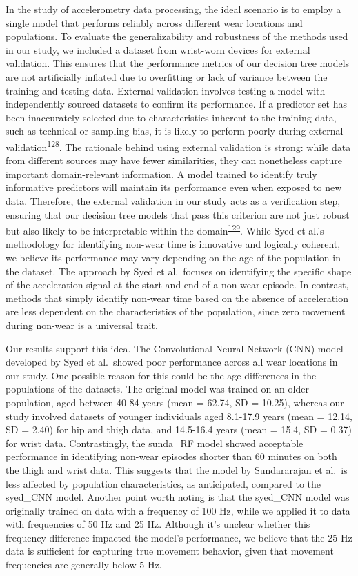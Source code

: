 \documentclass[
  9pt,
]{scrbook}
\begin{document}
In the study of accelerometry data processing, the ideal scenario is to
employ a single model that performs reliably across different wear
locations and populations. To evaluate the generalizability and
robustness of the methods used in our study, we included a dataset from
wrist-worn devices for external validation. This ensures that the
performance metrics of our decision tree models are not artificially
inflated due to overfitting or lack of variance between the training and
testing data. External validation involves testing a model with
independently sourced datasets to confirm its performance. If a
predictor set has been inaccurately selected due to characteristics
inherent to the training data, such as technical or sampling bias, it is
likely to perform poorly during external
validation\textsuperscript{\protect\hyperlink{ref-steyerberg_prediction_2016}{128}}.
The rationale behind using external validation is strong: while data
from different sources may have fewer similarities, they can nonetheless
capture important domain-relevant information. A model trained to
identify truly informative predictors will maintain its performance even
when exposed to new data. Therefore, the external validation in our
study acts as a verification step, ensuring that our decision tree
models that pass this criterion are not just robust but also likely to
be interpretable within the
domain\textsuperscript{\protect\hyperlink{ref-altman_prognosis_2009}{129}}.
While Syed et al.'s methodology for identifying non-wear time is
innovative and logically coherent, we believe its performance may vary
depending on the age of the population in the dataset. The approach by
Syed et al.~focuses on identifying the specific shape of the
acceleration signal at the start and end of a non-wear episode. In
contrast, methods that simply identify non-wear time based on the
absence of acceleration are less dependent on the characteristics of the
population, since zero movement during non-wear is a universal trait.

Our results support this idea. The Convolutional Neural Network (CNN)
model developed by Syed et al.~showed poor performance across all wear
locations in our study. One possible reason for this could be the age
differences in the populations of the datasets. The original model was
trained on an older population, aged between 40-84 years (mean = 62.74,
SD = 10.25), whereas our study involved datasets of younger individuals
aged 8.1-17.9 years (mean = 12.14, SD = 2.40) for hip and thigh data,
and 14.5-16.4 years (mean = 15.4, SD = 0.37) for wrist data.
Contrastingly, the sunda\_RF model showed acceptable performance in
identifying non-wear episodes shorter than 60 minutes on both the thigh
and wrist data. This suggests that the model by Sundararajan et al.~is
less affected by population characteristics, as anticipated, compared to
the syed\_CNN model. Another point worth noting is that the syed\_CNN
model was originally trained on data with a frequency of 100 Hz, while
we applied it to data with frequencies of 50 Hz and 25 Hz. Although it's
unclear whether this frequency difference impacted the model's
performance, we believe that the 25 Hz data is sufficient for capturing
true movement behavior, given that movement frequencies are generally
below 5 Hz.
\end{document}
